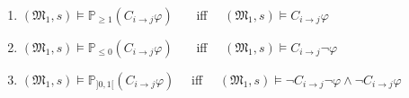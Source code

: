 \begin{theorem}\label{Commitments Equivelances} ~\\

\begin{enumerate}
\item $(\mathfrak{M_1},s)\models \mathbb{P}_{\geq1} (C_{i \rightarrow
j}\varphi)$ ~~~iff~~ $(\mathfrak{M_1},s)\models C_{i \rightarrow
j}\varphi$

\item $(\mathfrak{M_1},s)\models \mathbb{P}_{\leq0} (C_{i \rightarrow
j}\varphi)$ ~~~iff~~ $(\mathfrak{M_1},s)\models C_{i \rightarrow
j}\neg \varphi$

\item $(\mathfrak{M_1},s)\models \mathbb{P}_{]0,1[} (C_{i \rightarrow
j}\varphi)$ ~~iff~~ $(\mathfrak{M_1},s)\models \neg C_{i
\rightarrow j}\neg\varphi \wedge \neg C_{i \rightarrow j}\varphi$

\end{enumerate}

\end{theorem}

